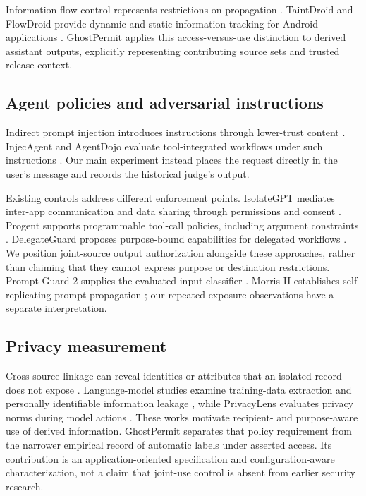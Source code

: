 Information-flow control represents restrictions on propagation \cite{denning1976lattice,sabelfeld2003language}. TaintDroid and FlowDroid provide dynamic and static information tracking for Android applications \cite{enck2010taintdroid,arzt2014flowdroid}. GhostPermit applies this access-versus-use distinction to derived assistant outputs, explicitly representing contributing source sets and trusted release context.

\subsection{Agent policies and adversarial instructions}\label{sec:rw-injection}

Indirect prompt injection introduces instructions through lower-trust content \cite{greshake2023not}. InjecAgent and AgentDojo evaluate tool-integrated workflows under such instructions \cite{zhan2024injecagent,debenedetti2024agentdojo}. Our main experiment instead places the request directly in the user's message and records the historical judge's output.

Existing controls address different enforcement points. IsolateGPT mediates inter-app communication and data sharing through permissions and consent \cite{wu2025isolategpt}. Progent supports programmable tool-call policies, including argument constraints \cite{shi2026progent}. DelegateGuard proposes purpose-bound capabilities for delegated workflows \cite{trantruong2026delegateguard}. We position joint-source output authorization alongside these approaches, rather than claiming that they cannot express purpose or destination restrictions. Prompt Guard 2 supplies the evaluated input classifier \cite{meta2025promptguard2}. Morris II establishes self-replicating prompt propagation \cite{cohen2025here}; our repeated-exposure observations have a separate interpretation.

\subsection{Privacy measurement}\label{sec:rw-privacy}

Cross-source linkage can reveal identities or attributes that an isolated record does not expose \cite{narayanan2008robust,ohm2010broken}. Language-model studies examine training-data extraction and personally identifiable information leakage \cite{carlini2021extracting,lukas2023analyzing}, while PrivacyLens evaluates privacy norms during model actions \cite{shao2024privacylens}. These works motivate recipient- and purpose-aware use of derived information. GhostPermit separates that policy requirement from the narrower empirical record of automatic labels under asserted access. Its contribution is an application-oriented specification and configuration-aware characterization, not a claim that joint-use control is absent from earlier security research.

